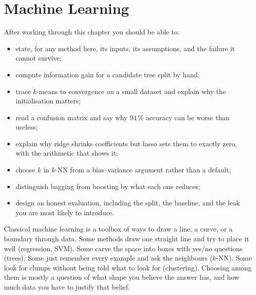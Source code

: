 
\chapter{Machine Learning}
\label{ch:machine-learning}


\begin{learningobjectives}
After working through this chapter you should be able to:
\begin{itemize}
  \item state, for any method here, its inputs, its assumptions, and the
        failure it cannot survive;
  \item compute information gain for a candidate tree split by hand;
  \item trace $k$-means to convergence on a small dataset and explain why the
        initialisation matters;
  \item read a confusion matrix and say why $94\,\%$ accuracy can be worse than
        useless;
  \item explain why ridge shrinks coefficients but lasso sets them to exactly
        zero, with the arithmetic that shows it;
  \item choose $k$ in $k$-NN from a bias--variance argument rather than a
        default;
  \item distinguish bagging from boosting by what each one reduces;
  \item design an honest evaluation, including the split, the baseline, and the
        leak you are most likely to introduce.
\end{itemize}
\end{learningobjectives}

\begin{plainlanguage}
Classical machine learning is a toolbox of ways to draw a line, a curve, or a
boundary through data. Some methods draw one straight line and try to place it
well (regression, SVM). Some carve the space into boxes with yes/no questions
(trees). Some just remember every example and ask the neighbours ($k$-NN). Some
look for clumps without being told what to look for (clustering). Choosing
among them is mostly a question of what shape you believe the answer has, and
how much data you have to justify that belief.
\end{plainlanguage}

